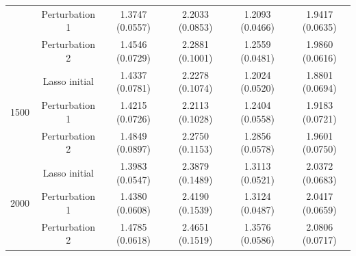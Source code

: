 \documentclass[12pt]{article}
\begin{document}
\begin{table}[!ht]
\begin{tabular}{cccccc}
        & Perturbation 1  & 1.3747 (0.0557) & 2.2033 (0.0853)& 1.2093 (0.0466)  & 1.9417 (0.0635)\\
        & Perturbation 2 & 1.4546 (0.0729) & 2.2881 (0.1001) & 1.2559 (0.0481) & 1.9860 (0.0616) \\
        \hline
        \multirow{3}{*}{1500} 
        & Lasso initial &1.4337 (0.0781) &2.2278 (0.1074) &1.2024 (0.0520) &1.8801 (0.0694) \\ 
        & Perturbation 1 & 1.4215 (0.0726) & 2.2113 (0.1028)  & 1.2404 (0.0558) & 1.9183 (0.0721)\\
        & Perturbation 2 & 1.4849 (0.0897) & 2.2750 (0.1153) & 1.2856 (0.0578) & 1.9601 (0.0750) \\
        \hline
        \multirow{3}{*}{2000} 
        & Lasso initial &1.3983 (0.0547) &2.3879 (0.1489) &1.3113 (0.0521) &2.0372 (0.0683) \\ 
        & Perturbation 1 & 1.4380 (0.0608) & 2.4190 (0.1539) & 1.3124 (0.0487)& 2.0417 (0.0659) \\
        & Perturbation 2& 1.4785 (0.0618)& 2.4651 (0.1519) & 1.3576 (0.0586) & 2.0806 (0.0717) \\
        \bottomrule
    \end{tabular}
\end{table}
\end{document}

